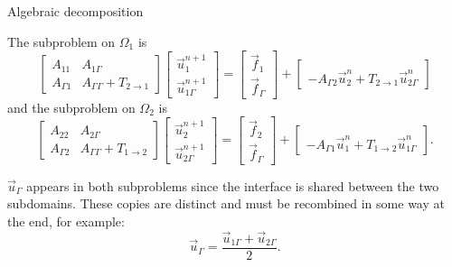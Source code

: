 \documentclass{beamer}
\begin{document}
\begin{frame}{Algebraic decomposition}

The subproblem on $\Omega_1$ is
\begin{equation*}
		\begin{bmatrix} A_{11} & A_{1 \Gamma} \\ A_{\Gamma 1} & A_{\Gamma \Gamma} + T_{2 \to 1} \end{bmatrix}
                            \begin{bmatrix} \vec{u}_1^{n+1} \\ \vec{u}_{1 \Gamma}^{n+1} \end{bmatrix}
                            = \begin{bmatrix} \vec{f}_1 \\ \vec{f}_\Gamma \end{bmatrix}
                            + \begin{bmatrix} ~ \\ -A_{\Gamma 2} \vec{u}_2^n + T_{2 \to 1} \vec{u}_{2 \Gamma}^n \end{bmatrix}
\end{equation*}
and the subproblem on $\Omega_2$ is
\begin{equation*}
       \begin{bmatrix} A_{22} & A_{2 \Gamma} \\ A_{\Gamma 2} & A_{\Gamma \Gamma} + T_{1 \to 2} \end{bmatrix}
                            \begin{bmatrix} \vec{u}_2^{n+1} \\ \vec{u}_{2 \Gamma}^{n+1} \end{bmatrix}
                            = \begin{bmatrix} \vec{f}_2 \\ \vec{f}_\Gamma \end{bmatrix}
                            + \begin{bmatrix} ~ \\ -A_{\Gamma 1} \vec{u}_1^n + T_{1 \to 2} \vec{u}_{1 \Gamma}^n \end{bmatrix}.
\end{equation*}

$\vec{u}_\Gamma$ appears in both subproblems since the interface is shared between the two subdomains.
These copies are distinct and must be recombined in some way at the end, for example:
\begin{equation*}
	\vec{u}_\Gamma = \frac{\vec{u}_{1 \Gamma} + \vec{u}_{2 \Gamma} }{2}.
\end{equation*}
\end{frame}
\end{document}
